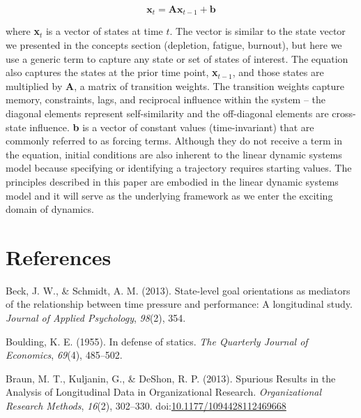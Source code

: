 \documentclass[english,,man]{apa6}
\theoremstyle{definition}
\theoremstyle{definition}
\theoremstyle{definition}
\theoremstyle{remark}
\begin{document}
\begin{equation}
\textbf{x}_t = \textbf{A} \textbf{x}_{t-1} + \textbf{b}
\end{equation}

\noindent where \textbf{x}\(_t\) is a vector of states at time \(t\).
The vector is similar to the state vector we presented in the concepts
section (depletion, fatigue, burnout), but here we use a generic term to
capture any state or set of states of interest. The equation also
captures the states at the prior time point, \textbf{x}\(_{t-1}\), and
those states are multiplied by \textbf{A}, a matrix of transition
weights. The transition weights capture memory, constraints, lags, and
reciprocal influence within the system -- the diagonal elements
represent self-similarity and the off-diagonal elements are cross-state
influence. \textbf{b} is a vector of constant values (time-invariant)
that are commonly referred to as forcing terms. Although they do not
receive a term in the equation, initial conditions are also inherent to
the linear dynamic systems model because specifying or identifying a
trajectory requires starting values. The principles described in this
paper are embodied in the linear dynamic systems model and it will serve
as the underlying framework as we enter the exciting domain of dynamics.

\newpage

\hypertarget{references}{%
\section{References}\label{references}}

\setlength{\parindent}{-0.5in}
\setlength{\leftskip}{0.5in}

\hypertarget{refs}{}
\leavevmode\hypertarget{ref-beck2013state}{}%
Beck, J. W., \& Schmidt, A. M. (2013). State-level goal orientations as
mediators of the relationship between time pressure and performance: A
longitudinal study. \emph{Journal of Applied Psychology}, \emph{98}(2),
354.

\leavevmode\hypertarget{ref-boulding1955defense}{}%
Boulding, K. E. (1955). In defense of statics. \emph{The Quarterly
Journal of Economics}, \emph{69}(4), 485--502.

\leavevmode\hypertarget{ref-braun_spurious_2013}{}%
Braun, M. T., Kuljanin, G., \& DeShon, R. P. (2013). Spurious Results in
the Analysis of Longitudinal Data in Organizational Research.
\emph{Organizational Research Methods}, \emph{16}(2), 302--330.
doi:\href{https://doi.org/10.1177/1094428112469668}{10.1177/1094428112469668}
\end{document}
